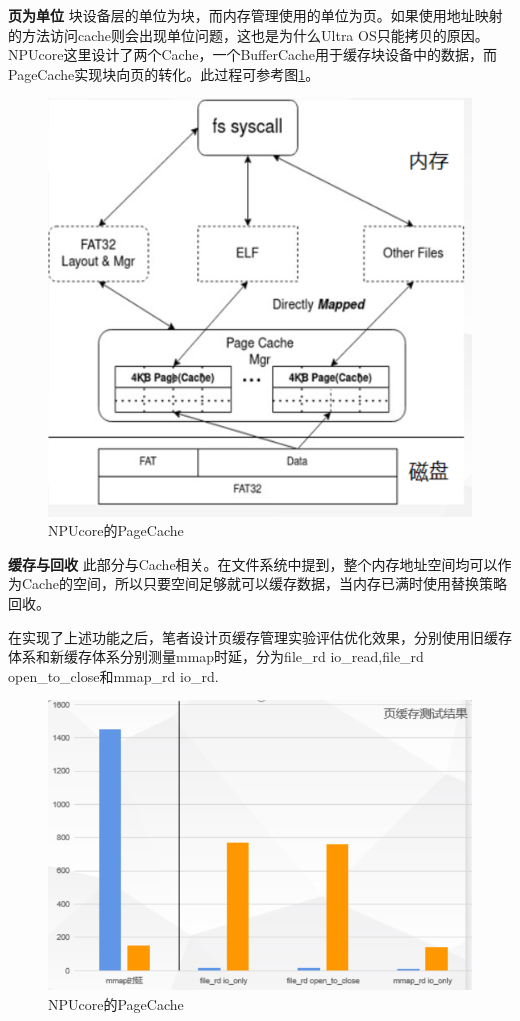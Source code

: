 \textbf{页为单位} \; 块设备层的单位为块，而内存管理使用的单位为页。如果使用地址映射的方法访问cache则会出现单位问题，这也是为什么Ultra OS只能拷贝的原因。NPUcore这里设计了两个Cache，一个BufferCache用于缓存块设备中的数据，而PageCache实现块向页的转化。此过程可参考图\ref{exam-8}。

\begin{figure}[htbp]
	\centering
	\includegraphics[scale=0.6]{figures/10-04/10-04-08.png}
	\caption{NPUcore的PageCache}
	\label{exam-8}
\end{figure}

\textbf{缓存与回收} \; 此部分与Cache相关。在文件系统中提到，整个内存地址空间均可以作为Cache的空间，所以只要空间足够就可以缓存数据，当内存已满时使用替换策略回收。

在实现了上述功能之后，笔者设计页缓存管理实验评估优化效果，分别使用旧缓存体系和新缓存体系分别测量mmap时延，分为file\_rd io\_read,file\_rd open\_to\_close和mmap_rd io\_rd.

\begin{figure}[htbp]
	\centering
	\includegraphics[scale=0.5]{figures/10-04/10-04-09.png}
	\caption{NPUcore的PageCache}
	\label{exam-9}
\end{figure}

